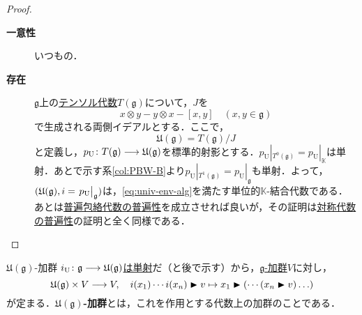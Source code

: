 \documentclass[rep_main]{subfiles}
\begin{document}
\begin{proof}
	\begin{description}
		\item[\textbf{一意性}] いつもの．
		\item[\textbf{存在}] $\mathfrak{g}$上の\hyperref[def:tensor-alg]{テンソル代数}$T(\mathfrak{g})$について，$J$を
		\begin{equation}
			\label{eq:univ-env-alg-J}
			x \otimes y - y \otimes x - [x, y]\quad  (x, y \in \mathfrak{g})
		\end{equation}
		で生成される両側イデアルとする．ここで，
		\begin{equation}
			\mathfrak{U}(\mathfrak{g}) = T(\mathfrak{g}) / J
		\end{equation}
		と定義し，$p_\text{U} \colon T(\mathfrak{g}) \longrightarrow \mathfrak{U}(\mathfrak{g})$を標準的射影とする．$p_\text{U}|_{T^0(\mathfrak{g})} = p_\text{U}|_\mathbb{K}$は単射．あとで示す系\ref{col:PBW-B}より$p_\text{U}|_{T^1(\mathfrak{g})} = p_\text{U}|_\mathfrak{g}$も単射．よって，$(\mathfrak{U}(\mathfrak{g}), i = \eval{p_\text{U}}_\mathfrak{g})$は，\eqref{eq:univ-env-alg}を満たす単位的$\mathbb{K}$-結合代数である．\\
		あとは\hyperref[def:univ-env-alg]{普遍包絡代数の普遍性}を成立させれば良いが，その証明は\hyperref[sym-alg-univ]{対称代数の普遍性}の証明と全く同様である．
	\end{description}
\end{proof}
\begin{mydef}[label=def:univ-env-alg-module]{$\mathfrak{U}(\mathfrak{g})$-加群}
	\hyperref[col:PBW-C]{$i_\text{U}\colon \mathfrak{g} \longrightarrow \mathfrak{U}(\mathfrak{g})$は単射}だ（と後で示す）から，\hyperref[ax:g-module]{$\mathfrak{g}$-加群}$V$に対し，
	\begin{equation}
		\mathfrak{U}(\mathfrak{g}) \times V \longrightarrow V,\quad  i(x_1) \cdots i(x_n) \blacktriangleright v \mapsto x_1 \blacktriangleright ( \cdots (x_n \blacktriangleright v)\ldots)
	\end{equation}
	が定まる．\textbf{$\mathfrak{U}(\mathfrak{g})$-加群}とは，これを作用とする代数上の加群のことである．
\end{mydef}
\end{document}
